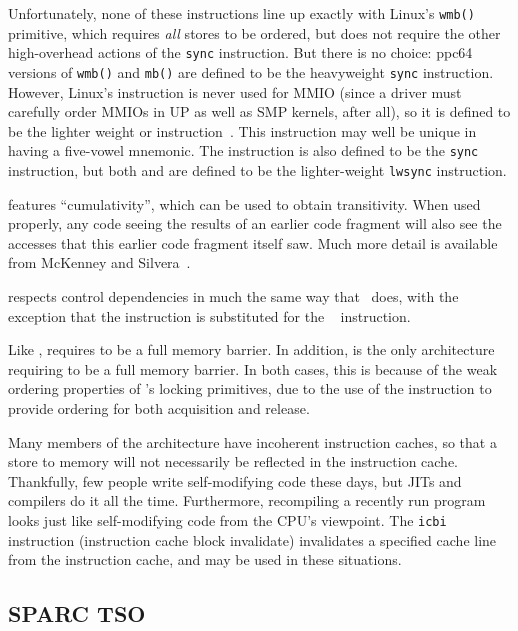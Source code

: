 Unfortunately, none of these instructions line up exactly with Linux's
{\tt wmb()} primitive, which requires {\em all} stores to be ordered,
but does not require the other high-overhead actions of the {\tt sync}
instruction.
But there is no choice: ppc64 versions of {\tt wmb()} and {\tt mb()} are
defined to be the heavyweight {\tt sync} instruction.
However, Linux's  instruction is never used for MMIO
(since a driver must carefully order MMIOs in UP as well as
SMP kernels, after all), so it is defined to be the lighter weight
 or  instruction~\cite{PaulEMcKenney2016LinuxKernelMMIO}.
This instruction may well be unique in having a five-vowel mnemonic.
The  instruction is also defined to be the {\tt sync}
instruction, but both  and  are defined to
be the lighter-weight {\tt lwsync} instruction.

\Power{} features ``cumulativity'', which can be used to obtain
transitivity.
When used properly, any code seeing the results of an earlier
code fragment will also see the accesses that this earlier code
fragment itself saw.
Much more detail is available from
McKenney and Silvera~\cite{PaulEMcKenneyN2745r2009}.

\Power{} respects control dependencies in much the same way that \ARM\
does, with the exception that the \Power{}  instruction
is substituted for the \ARM\ \co{ISB} instruction.

Like , \Power{} requires  to be
a full memory barrier.
In addition, \Power{} is the only architecture requiring
 to be a full memory barrier.
In both cases, this is because of the weak ordering properties
of \Power{}'s locking primitives, due to the use of the 
instruction to provide ordering for both acquisition and release.

Many members of the \Power{} architecture have incoherent instruction
caches, so that a store to memory will not necessarily be reflected
in the instruction cache.
Thankfully, few people write self-modifying code these days, but JITs
and compilers do it all the time.
Furthermore, recompiling a recently run program looks just like
self-modifying code from the CPU's viewpoint.
The {\tt icbi} instruction (instruction cache block invalidate)
invalidates a specified cache line from
the instruction cache, and may be used in these situations.

\subsection{SPARC TSO}

